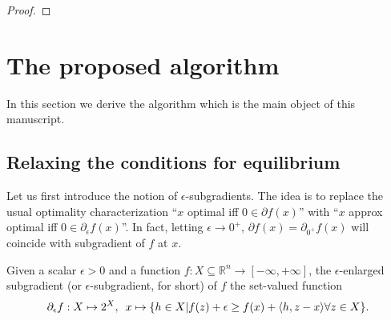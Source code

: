 \documentclass[envcountsame]{llcns2e/llncs}
\begin{document}
\begin{proof}
\end{proof}



\section{The proposed algorithm}
\label{sec:algo}
In this section we derive the algorithm which is the main object of
this manuscript.

\subsection{Relaxing the conditions for equilibrium}
Let us first introduce the notion of $\epsilon$-subgradients. The idea
is to replace the usual optimality characterization ``$x$ optimal iff
$0 \in \partial f(x)$'' with ``$x$ approx optimal iff $0 \in
\partial_\epsilon f(x)$''. In fact, letting $\epsilon \rightarrow 0^+$,
$\partial f(x) = \partial_{0^+}f(x)$ will coincide with
subgradient of $f$ at $x$.

\begin{definition}
Given a scalar $\epsilon > 0$ and a function $f:X \subseteq \mathbb{R}^n
\rightarrow [-\infty,+\infty]$, the $\epsilon$-enlarged subgradient (or
$\epsilon$-subgradient, for short) of $f$ the set-valued function
\begin{eqnarray}
\partial_\epsilon f: X \mapsto 2^X, \hspace{.5em} x \mapsto \{h\in X |
f(z) + \epsilon \ge f(x) + \langle h, z - x\rangle \forall z \in X\}.
\end{eqnarray}
\end{definition}
\end{document}

